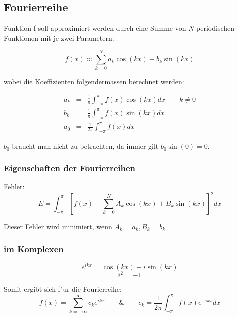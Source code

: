 \documentclass[german, 10pt, a4paper, twocolumn]{scrartcl}
\begin{document}
\subsection{Fourierreihe}

Funktion f soll approximiert werden durch eine Summe von $N$ periodischen Funktionen mit je zwei Parametern:

\begin{displaymath}
	f(x) \approx \sum^N_{k=0} a_k \cos(kx) + b_k \sin(kx)
\end{displaymath}

wobei die Koeffizienten folgendermassen berechnet werden:

\begin{eqnarray}
		a_k &	 = &	\frac{1}{\pi}\int^\pi_{-\pi} f(x)\cos(kx)dx \qquad k\neq 0 \nonumber \\
		b_k &	 = &	\frac{1}{\pi}\int^\pi_{-\pi} f(x)\sin(kx)dx \nonumber \\
		a_0 &	 = &	\frac{1}{2\pi}\int^\pi_{-\pi} f(x)dx \nonumber
\end{eqnarray}

$b_0$ braucht man nicht zu betrachten, da immer gilt $b_0\sin(0)=0$.

\subsubsection{Eigenschaften der Fourierreihen}

Fehler:
\begin{displaymath}
	E = \int^\pi_{-\pi} \left [ f(x) - \sum^N_{k=0} A_k \cos(kx)+ B_k\sin(kx) \right ] ^2 dx
\end{displaymath}

Dieser Fehler wird minimiert, wenn $A_k = a_k, B_k = b_k$

\subsubsection{im Komplexen}

\begin{displaymath}
	e^{ikx} = \cos (kx) + i\sin(kx)
\end{displaymath}
\begin{displaymath}
	i^{2} = -1
\end{displaymath}

Somit ergibt sich f"ur die Fourierreihe:
\begin{displaymath}
	f(x) = \sum^\infty_{k=-\infty} c_k e^{ikx} \qquad \mbox{\&} \qquad c_k = \frac{1}{2\pi}\int_{-\pi}^\pi f(x) e^{-ikx} dx
\end{displaymath}
\end{document}
